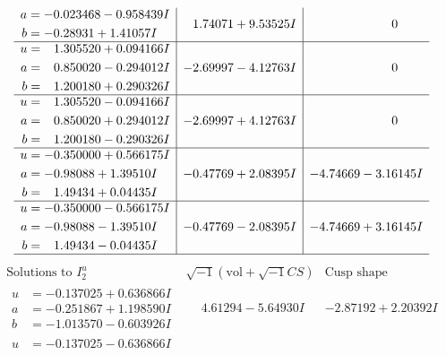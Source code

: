 \documentclass[1p]{elsarticle_modified}
\theoremstyle{definition}
\newcommand{\I}{\sqrt{-1}}
\begin{document}
$$\begin{array}{c|c|c}
\begin{aligned}
a &= -0.023468 - 0.958439 I \\
b &= -0.28931 + 1.41057 I\end{aligned}
 & \phantom{-}1.74071 + 9.53525 I & \phantom{-0.000000 } 0 \\ \hline\begin{aligned}
u &= \phantom{-}1.305520 + 0.094166 I \\
a &= \phantom{-}0.850020 - 0.294012 I \\
b &= \phantom{-}1.200180 + 0.290326 I\end{aligned}
 & -2.69997 - 4.12763 I & \phantom{-0.000000 } 0 \\ \hline\begin{aligned}
u &= \phantom{-}1.305520 - 0.094166 I \\
a &= \phantom{-}0.850020 + 0.294012 I \\
b &= \phantom{-}1.200180 - 0.290326 I\end{aligned}
 & -2.69997 + 4.12763 I & \phantom{-0.000000 } 0 \\ \hline\begin{aligned}
u &= -0.350000 + 0.566175 I \\
a &= -0.98088 + 1.39510 I \\
b &= \phantom{-}1.49434 + 0.04435 I\end{aligned}
 & -0.47769 + 2.08395 I & -4.74669 - 3.16145 I \\ \hline\begin{aligned}
u &= -0.350000 - 0.566175 I \\
a &= -0.98088 - 1.39510 I \\
b &= \phantom{-}1.49434 - 0.04435 I\end{aligned}
 & -0.47769 - 2.08395 I & -4.74669 + 3.16145 I\\
 \hline 
 \end{array}$$\newpage$$\begin{array}{c|c|c}  
\text{Solutions to }I^u_{2}& \I (\text{vol} + \sqrt{-1}CS) & \text{Cusp shape}\\
 \hline 
\begin{aligned}
u &= -0.137025 + 0.636866 I \\
a &= -0.251867 + 1.198590 I \\
b &= -1.013570 - 0.603926 I\end{aligned}
 & \phantom{-}4.61294 - 5.64930 I & -2.87192 + 2.20392 I \\ \hline\begin{aligned}
u &= -0.137025 - 0.636866 I \\

\end{aligned}
\end{array}$$
\end{document}
